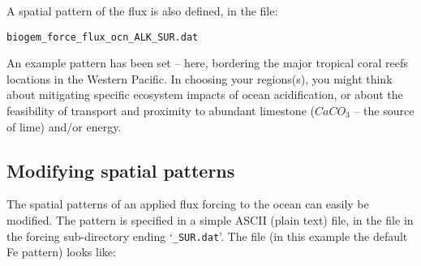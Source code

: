 \documentclass[11pt,fleqn]{book} %
\begin{document}
A spatial pattern of the flux is also defined, in the file:
\vspace{-2pt}\small\begin{verbatim}
biogem_force_flux_ocn_ALK_SUR.dat
\end{verbatim}\normalsize\vspace{-2pt}

An example pattern has been set – here, bordering the major tropical coral reefs locations in the Western Pacific. In choosing your regions(s), you might think about mitigating specific ecosystem impacts of ocean acidification, or about the feasibility of transport and proximity to abundant limestone (\(CaCO_{3}\) – the source of lime) and/or energy.


\subsection{Modifying spatial patterns}

The spatial patterns of an applied flux forcing to the ocean can easily be modified. The pattern is specified in a simple ASCII (plain text) file, in the file in the forcing sub-directory ending ‘\texttt{\_SUR.dat}’. The file (in this example the default Fe pattern) looks like:

\newpage
\end{document}
